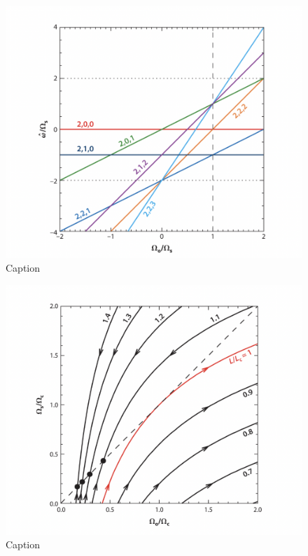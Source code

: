 \documentclass[oneside,12pt]{amsart}
\numberwithin{page}{section}
\begin{document}

\begin{figure}[htbp]
    \centering
    \includegraphics[width=0.5\linewidth]{figs/ogilvie_fig2.png}
    \caption{Caption}
    \label{fig:ogilvie-fig2}
\end{figure}

\begin{figure}[htbp]
    \centering
    \includegraphics[width=0.5\linewidth]{figs/ogilvie_fig10.png}
    \caption{Caption}
    \label{fig:ogilvie-fig10}
\end{figure}
\end{document}
